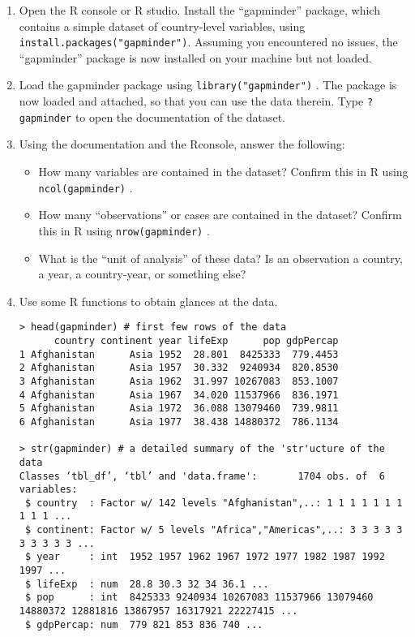 \documentclass[a4paper,12pt]{article}
\begin{document}
\begin{enumerate}\itemsep2em
\item Open the R console or R studio. Install the ``gapminder'' package, which contains a simple dataset of country-level variables, using \texttt{install.packages("gapminder")}. Assuming you encountered no issues, the ``gapminder'' package is now installed on your machine but not loaded.

\item Load the gapminder package using \texttt{library("gapminder")} . The package is now loaded and attached, so that you can use the data therein. Type \texttt{? gapminder} to open the documentation of the dataset.

\item Using the documentation and the Rconsole, answer the following:

	\begin{itemize}
	\item How many variables are contained in the dataset? Confirm this in R using \texttt{ncol(gapminder)} .
	\item How many ``observations'' or cases are contained in the dataset? Confirm this in R using \texttt{nrow(gapminder)} .
	\item What is the ``unit of analysis'' of these data? Is an observation a country, a year, a country-year, or something else?
	\end{itemize}

\item Use some R functions to obtain glances at the data. 

\begin{verbatim}
> head(gapminder) # first few rows of the data
      country continent year lifeExp      pop gdpPercap
1 Afghanistan      Asia 1952  28.801  8425333  779.4453
2 Afghanistan      Asia 1957  30.332  9240934  820.8530
3 Afghanistan      Asia 1962  31.997 10267083  853.1007
4 Afghanistan      Asia 1967  34.020 11537966  836.1971
5 Afghanistan      Asia 1972  36.088 13079460  739.9811
6 Afghanistan      Asia 1977  38.438 14880372  786.1134

> str(gapminder) # a detailed summary of the 'str'ucture of the data
Classes ‘tbl_df’, ‘tbl’ and 'data.frame':       1704 obs. of  6 variables:
 $ country  : Factor w/ 142 levels "Afghanistan",..: 1 1 1 1 1 1 1 1 1 1 ...
 $ continent: Factor w/ 5 levels "Africa","Americas",..: 3 3 3 3 3 3 3 3 3 3 ...
 $ year     : int  1952 1957 1962 1967 1972 1977 1982 1987 1992 1997 ...
 $ lifeExp  : num  28.8 30.3 32 34 36.1 ...
 $ pop      : int  8425333 9240934 10267083 11537966 13079460 14880372 12881816 13867957 16317921 22227415 ...
 $ gdpPercap: num  779 821 853 836 740 ...


\end{verbatim}
\end{enumerate}
\end{document}

